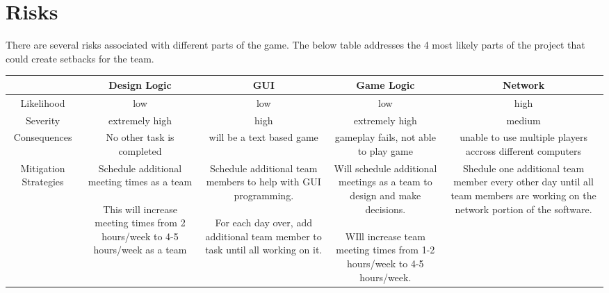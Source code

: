 \documentclass[11pt, titlepage]{article}
\begin{document}
    \section{Risks}

	    There are several risks associated with different parts of the game.  The below table addresses the 4 most likely parts of the project that could create setbacks for the team.

				\begin{tabular}{| c | c | c | c | c |}
					\hline	 
						&\parbox{3cm}{Design Logic} 
						& \parbox{3cm}{GUI} 
						& \parbox{3cm}{Game Logic} 
						& \parbox{3cm}{Network} \\
					\hline	Likelihood 
						& low 
						& low 
						& low 
						& high \\
					\hline Severity 
						&extremely high 
						& high 
						& extremely high
						&  medium\\
					\hline Consequences 
						& \parbox{3cm}{No other task is completed} 
						& \parbox{3cm}{will be a text based game}
						& \parbox{3cm}{gameplay fails, not able to play game}
						& \parbox{3cm}{unable to use multiple players accross different computers} \\
					\hline Mitigation Strategies 
						& \parbox{3cm}{
									Schedule additional meeting times as a team
									\\ \\This will increase meeting times from 2 hours/week to 4-5 hours/week as a team
							}
						&  \parbox{3cm}{
									Schedule additional team members to help with GUI programming.
									\\ \\For each day over, add additional team member to task until all working on it.
							}
						& \parbox{3cm}{
								Will schedule additional meetings as a team to design and make decisions.
								\\ \\WIll increase team meeting times from 1-2 hours/week to 4-5 hours/week.
								} 
						&\parbox{3cm}{Shedule one additional team member every other day until all team members are working on the network portion of the software.  }\\
					\hline
				\end{tabular}
\end{document}
